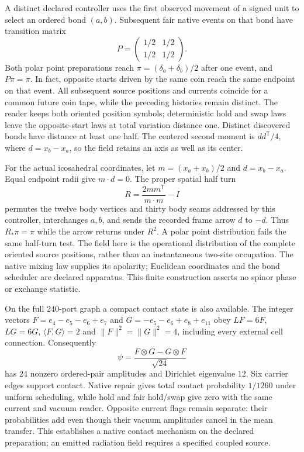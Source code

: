 A distinct declared controller uses the first observed movement of a
signed unit to select an ordered bond $(a,b)$. Subsequent fair native
events on that bond have transition matrix
\[
 P=\begin{pmatrix}1/2&1/2\\1/2&1/2\end{pmatrix}.
\]
Both polar point preparations reach
$\pi=(\delta_a+\delta_b)/2$ after one event, and $P\pi=\pi$.
In fact, opposite starts driven by the same coin reach the same endpoint
on that event. All subsequent source positions and currents coincide
for a common future coin tape, while the preceding histories remain
distinct. The reader keeps both oriented position symbols;
deterministic hold and swap laws leave the opposite-start laws at total
variation distance one. Distinct discovered bonds have distance at least
one half. The centered second moment is $dd^{\mathsf T}/4$, where
$d=x_b-x_a$, so the field retains an axis as well as its center.

For the actual icosahedral coordinates, let
$m=(x_a+x_b)/2$ and $d=x_b-x_a$. Equal endpoint radii give $m\cdot d=0$.
The proper spatial half turn
\[
 R=\frac{2mm^{\mathsf T}}{m\cdot m}-I
\]
permutes the twelve body vertices and thirty body seams addressed by
this controller, interchanges $a,b$, and sends
the recorded frame arrow $d$ to $-d$. Thus $R_*\pi=\pi$ while the
arrow returns under $R^2$. A polar point distribution fails the same
half-turn test. The field here is the operational distribution of the
complete oriented source positions, rather than an instantaneous
two-site occupation. The native mixing law supplies its apolarity;
Euclidean coordinates and the bond scheduler are declared apparatus.
This finite construction asserts no spinor phase or exchange statistic.

On the full $240$-port graph a compact contact state is also available.
The integer vectors
$F=e_4-e_5-e_6+e_7$ and $G=-e_5-e_6+e_8+e_{11}$ obey
$LF=6F$, $LG=6G$, $\langle F,G\rangle=2$ and
$\|F\|^2=\|G\|^2=4$, including every external cell connection.
Consequently
\[
 \psi=\frac{F\otimes G-G\otimes F}{\sqrt{24}}
\]
has $24$ nonzero ordered-pair amplitudes and Dirichlet eigenvalue $12$.
Six carrier edges support contact. Native repair gives total contact
probability $1/1260$ under uniform scheduling, while hold and fair
hold/swap give zero with the same current and vacuum reader. Opposite
current flags remain separate: their probabilities add even though
their vacuum amplitudes cancel in the mean transfer. This establishes
a native contact mechanism on the declared preparation; an emitted
radiation field requires a specified coupled source.

